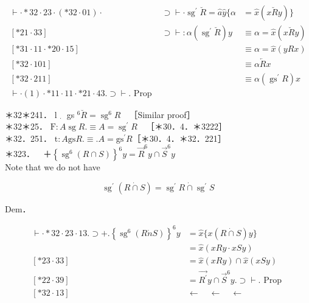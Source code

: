 \documentclass[10pt]{article}
\begin{document}
$$
\begin{array}{lll}
\vdash \cdot * 32 \cdot 23 \cdot(* 32 \cdot 01) \cdot & \supset \vdash \cdot \operatorname{sg}^{\prime} \breve{R}=\hat{a} \hat{y}\{\alpha & =\hat{x}(x \breve{R} y)\} \\
{[* 21 \cdot 33]} & \supset \vdash: \alpha\left(\operatorname{sg}^{\prime} \breve{R}\right) y & \equiv \alpha=\hat{x}(x \breve{R} y) \\
{[* 31 \cdot 11 \cdot * 20 \cdot 15]} & & \equiv \alpha=\hat{x}(y R x) \\
{[* 32 \cdot 101]} & & \equiv \alpha \overleftarrow{R} x \\
{[* 32 \cdot 211]} & & \equiv \alpha\left(\operatorname{gs}^{\prime} R\right) x \\
\vdash \cdot(1) \cdot * 11 \cdot 11 \cdot * 21 \cdot 43 . \supset \vdash . \text { Prop } &
\end{array}
$$

＊32＊241． l $_{\text {⋅ }}$ gs $^{6} \breve{R}=\operatorname{sg}^{6} R \quad$［Similar proof］\\
＊32＊25． $\mathrm{F}: A \operatorname{sg} R . \equiv A=\operatorname{sg}^{\prime} R \quad$［＊30．4．＊3222］\\
＊32．251． $\mathrm{t}: A \mathrm{gs} R . \equiv . A=\mathrm{gs}^{\prime} R$［＊30．4．＊32．221］\\
＊323．$\quad$＋$\left\{\operatorname{sg}^{6}(R \cap S)\right\}^{6} y=\vec{R}^{6} y \cap \vec{S}^{6} y$\\
Note that we do not have

$$
\operatorname{sg}^{\prime}(R \dot{\cap} S)=\operatorname{sg}^{\prime} R \dot{\cap} \operatorname{sg}^{\prime} S
$$

Dem．

$$
\begin{aligned}
\vdash \cdot * 32 \cdot 23 \cdot 13 . \supset+.\left\{\operatorname{sg}^{6}(R \dot{n} S)\right\}^{6} y & =\widehat{x}\{x(R \dot{\cap} S) y\} \\
& =\widehat{x}(x R y \cdot x S y) \\
{[* 23 \cdot 33] } & =\widehat{x}(x R y) \cap \widehat{x}(x S y) \\
{[* 22 \cdot 39] } & =\overrightarrow{R^{\prime}} y \cap \vec{S}^{6} y . \supset \vdash . \text { Prop } \\
{[* 32 \cdot 13] } & \leftarrow \quad \leftarrow \quad \leftarrow \quad
\end{aligned}
$$
\end{document}
